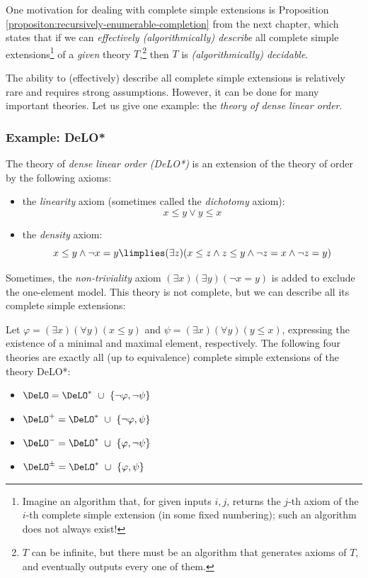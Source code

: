 \begin{remark}
    One motivation for dealing with complete simple extensions is Proposition \ref{propositon:recursively-enumerable-completion} from the next chapter, which states that if we can \emph{effectively (algorithmically) describe} all complete simple extensions\footnote{Imagine an algorithm that, for given inputs $i,j$, returns the $j$-th axiom of the $i$-th complete simple extension (in some fixed numbering); such an algorithm does not always exist!} of a \emph{given} theory $T$,\footnote{$T$ can be infinite, but there must be an algorithm that generates axioms of $T$, and eventually outputs every one of them.} then $T$ is \emph{(algorithmically) decidable}.
\end{remark}

The ability to (effectively) describe all complete simple extensions is relatively rare and requires strong assumptions. However, it can be done for many important theories. Let us give one example: the \emph{theory of dense linear order}.

\subsubsection{Example: DeLO*}

The theory of \emph{dense linear order (DeLO*)} is an extension of the theory of order by the following axioms:
\begin{itemize}
    \item the \emph{linearity} axiom (sometimes called the \emph{dichotomy} axiom):
    $$
    x \leq y \lor y \leq x
    $$
    \item the \emph{density} axiom:
    $$
    {x \leq y} \land {\neg x = y} \limplies (\exists z)(x \leq z \land z \leq y \land \neg z = x \land \neg z = y)
    $$
\end{itemize}
Sometimes, the \emph{non-triviality} axiom $(\exists x)(\exists y)(\neg x = y)$ is added to exclude the one-element model. This theory is not complete, but we can describe all its complete simple extensions:

\begin{proposition}
Let $\varphi = (\exists x)(\forall y)(x \leq y)$ and $\psi = (\exists x)(\forall y)(y \leq x)$, expressing the existence of a minimal and maximal element, respectively. The following four theories are exactly all (up to equivalence) complete simple extensions of the theory DeLO*:
\begin{itemize}
    \item $\DeLO = \DeLO^* \ \cup \ \{\neg\varphi, \neg\psi\}$
    \item $\DeLO^+ = \DeLO^* \ \cup \ \{\neg\varphi, \psi\}$
    \item $\DeLO^- = \DeLO^* \ \cup \ \{\varphi, \neg\psi\}$
    \item $\DeLO^\pm = \DeLO^* \ \cup \ \{\varphi, \psi\}$        
\end{itemize}
\end{proposition}

